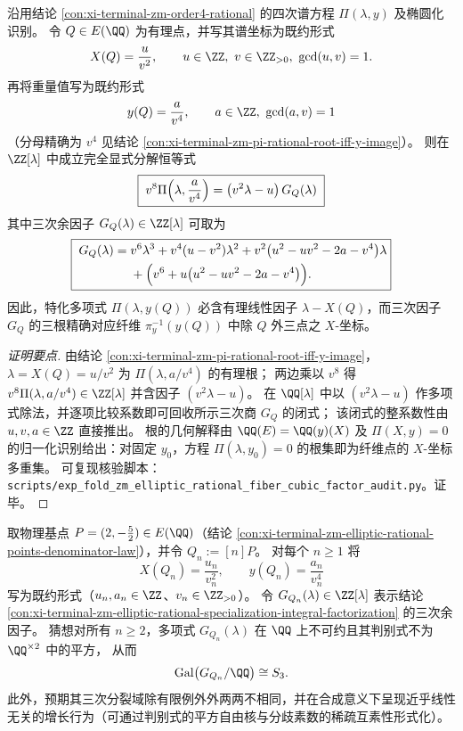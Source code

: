 \begin{conclusion}\label{con:xi-terminal-zm-elliptic-rational-specialization-integral-factorization}
沿用结论 \ref{con:xi-terminal-zm-order4-rational} 的四次谱方程 \(\Pi(\lambda,y)\) 及椭圆化识别。
令 \(Q\in E(\QQ)\) 为有理点，并写其谱坐标为既约形式
\[
X(Q)=\frac{u}{v^{2}},
\qquad u\in\ZZ,\ v\in\ZZ_{>0},\ \gcd(u,v)=1.
\]
再将重量值写为既约形式
\[
y(Q)=\frac{a}{v^{4}},
\qquad a\in\ZZ,\ \gcd(a,v)=1
\]
（分母精确为 \(v^{4}\) 见结论 \ref{con:xi-terminal-zm-pi-rational-root-iff-y-image}）。
则在 \(\ZZ[\lambda]\) 中成立完全显式分解恒等式
\[
\boxed{\;
v^{8}\Pi\Bigl(\lambda,\frac{a}{v^{4}}\Bigr)=\bigl(v^{2}\lambda-u\bigr)\,G_{Q}(\lambda)\;}
\]
其中三次余因子 \(G_Q(\lambda)\in\ZZ[\lambda]\) 可取为
\[
\boxed{\;
\begin{aligned}
G_Q(\lambda)=\;&v^{6}\lambda^{3}
+v^{4}(u-v^{2})\lambda^{2}
+v^{2}\bigl(u^{2}-uv^{2}-2a-v^{4}\bigr)\lambda\\
&+\Bigl(v^{6}+u\bigl(u^{2}-uv^{2}-2a-v^{4}\bigr)\Bigr).
\end{aligned}}
\]
因此，特化多项式 \(\Pi(\lambda,y(Q))\) 必含有理线性因子 \(\lambda-X(Q)\)，而三次因子 \(G_Q\) 的三根精确对应纤维 \(\pi_y^{-1}(y(Q))\) 中除 \(Q\) 外三点之 \(X\)-坐标。
\end{conclusion}
\begin{proof}[证明要点]
由结论 \ref{con:xi-terminal-zm-pi-rational-root-iff-y-image}，\(\lambda=X(Q)=u/v^{2}\) 为 \(\Pi(\lambda,a/v^{4})\) 的有理根；
两边乘以 \(v^{8}\) 得 \(v^{8}\Pi(\lambda,a/v^{4})\in\ZZ[\lambda]\) 并含因子 \((v^{2}\lambda-u)\)。
在 \(\QQ[\lambda]\) 中以 \((v^{2}\lambda-u)\) 作多项式除法，并逐项比较系数即可回收所示三次商 \(G_Q\) 的闭式；
该闭式的整系数性由 \(u,v,a\in\ZZ\) 直接推出。
根的几何解释由 \(\QQ(E)=\QQ(y)(X)\) 及 \(\Pi(X,y)=0\) 的归一化识别给出：对固定 \(y_0\)，方程 \(\Pi(\lambda,y_0)=0\) 的根集即为纤维点的 \(X\)-坐标多重集。
可复现核验脚本：\texttt{scripts/exp\_fold\_zm\_elliptic\_rational\_fiber\_cubic\_factor\_audit.py}。证毕。
\end{proof}

\begin{conjecture}[倍乘轨道诱导的三次余因子之满对称伽罗瓦性]\label{conj:xi-terminal-zm-elliptic-rational-fiber-cubic-s3-galois}
取物理基点 \(P=(2,-\tfrac52)\in E(\QQ)\)（结论 \ref{con:xi-terminal-zm-elliptic-rational-points-denominator-law}），并令 \(Q_n:=[n]P\)。
对每个 \(n\ge 1\) 将
\[
X(Q_n)=\frac{u_n}{v_n^2},
\qquad
y(Q_n)=\frac{a_n}{v_n^4}
\]
写为既约形式（\(u_n,a_n\in\ZZ\)、\(v_n\in\ZZ_{>0}\)）。
令 \(G_{Q_n}(\lambda)\in\ZZ[\lambda]\) 表示结论 \ref{con:xi-terminal-zm-elliptic-rational-specialization-integral-factorization} 的三次余因子。
猜想对所有 \(n\ge 2\)，多项式 \(G_{Q_n}(\lambda)\) 在 \(\QQ\) 上不可约且其判别式不为 \(\QQ^{\times 2}\) 中的平方，
从而
\[
\mathrm{Gal}\bigl(G_{Q_n}/\QQ\bigr)\cong S_3.
\]
此外，预期其三次分裂域除有限例外外两两不相同，并在合成意义下呈现近乎线性无关的增长行为（可通过判别式的平方自由核与分歧素数的稀疏互素性形式化）。
\end{conjecture}

